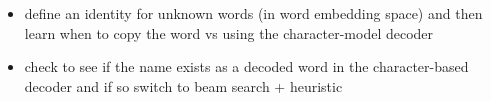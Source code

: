\documentclass{article}
\begin{document}
\begin{enumerate}
\begin{itemize}

\item define an identity for unknown words (in word embedding space) and then learn when to copy the word vs using the character-model decoder
\item check to see if the name exists as a decoded word in the character-based decoder and if so switch to beam search + heuristic

\end{itemize}


\end{enumerate}
\end{document}
